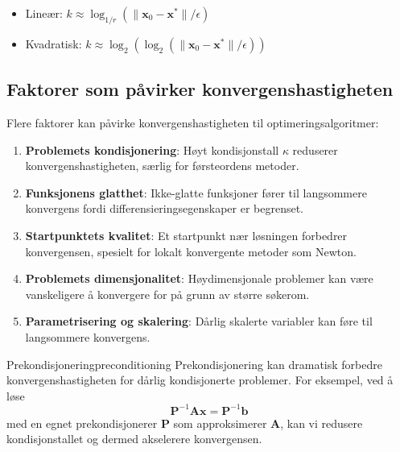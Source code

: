 \begin{itemize}
	\item Lineær: \(k \approx \log_{1/r}(\|\symbf{x}_0 - \symbf{x}^\ast\|/\epsilon)\)
	\item Kvadratisk: \(k \approx \log_2(\log_2(\|\symbf{x}_0 - \symbf{x}^\ast\|/\epsilon))\)
\end{itemize}

\subsection{Faktorer som påvirker konvergenshastigheten}

Flere faktorer kan påvirke konvergenshastigheten til optimeringsalgoritmer:

\begin{enumerate}
	\item \textbf{Problemets kondisjonering}: Høyt kondisjonstall \(\kappa\) reduserer konvergenshastigheten, særlig for førsteordens metoder.

	\item \textbf{Funksjonens glatthet}: Ikke-glatte funksjoner fører til langsommere konvergens fordi differensieringsegenskaper er begrenset.

	\item \textbf{Startpunktets kvalitet}: Et startpunkt nær løsningen forbedrer konvergensen, spesielt for lokalt konvergente metoder som Newton.

	\item \textbf{Problemets dimensjonalitet}: Høydimensjonale problemer kan være vanskeligere å konvergere for på grunn av større søkerom.

	\item \textbf{Parametrisering og skalering}: Dårlig skalerte variabler kan føre til langsommere konvergens.
\end{enumerate}

\begin{example}{Prekondisjonering}{preconditioning}
	Prekondisjonering kan dramatisk forbedre konvergenshastigheten for dårlig kondisjonerte problemer. For eksempel, ved å løse
	\[
		\symbf{P}^{-1}\symbf{A}\symbf{x} = \symbf{P}^{-1}\symbf{b}
	\]
	med en egnet prekondisjonerer \(\symbf{P}\) som approksimerer \(\symbf{A}\), kan vi redusere kondisjonstallet og dermed akselerere konvergensen.
\end{example}

